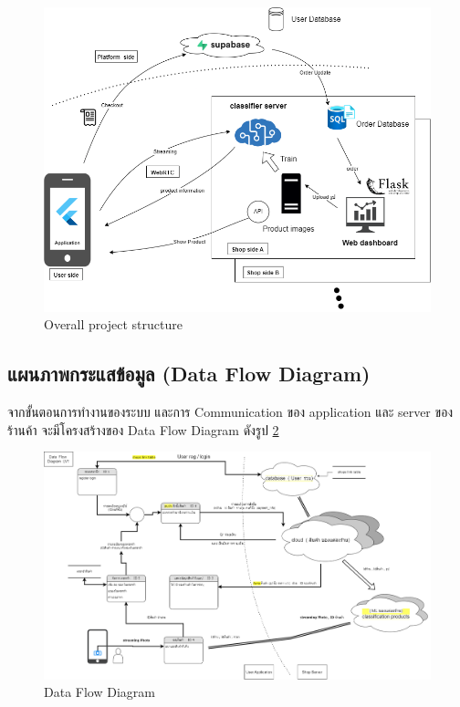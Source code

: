 \begin{figure}[h]
  \begin{center}
  \vspace{0.5cm}\includegraphics[scale=0.3]{pic/overall_2.png}
  \end{center}
  
  \caption[Overall project structure]{Overall project structure}
  \label{fig:Overall project structure}
  \end{figure}

  \newpage
  \subsection{แผนภาพกระแสข้อมูล (Data Flow Diagram)}
 จากขั้นตอนการทำงานของระบบ  และการ Communication ของ application และ server ของร้านค้า  
 จะมีโครงสร้างของ Data Flow Diagram ดังรูป \ref{fig:Data Flow Diagram}
\begin{figure}[h]
  \begin{center}
  \includegraphics[scale=0.25]{pic/dataflow-lv0.png}
  \end{center}
  
  \caption[Data Flow Diagram]{Data Flow Diagram}
  \label{fig:Data Flow Diagram}
  \end{figure}

